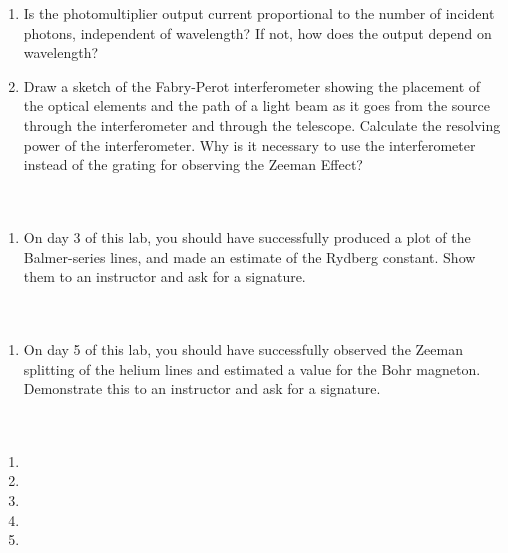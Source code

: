 \documentclass{signatures}
\begin{document}
\begin{enumerate}
    \item Is the photomultiplier output current proportional to the number of incident photons, independent of wavelength? If not, how does the output depend on wavelength?

    \item Draw a sketch of the Fabry-Perot interferometer showing the placement of the optical elements and the path of a light beam as it goes from the source through the interferometer and through the telescope. Calculate the resolving power of the interferometer. Why is it necessary to use the interferometer instead of the grating for observing the Zeeman Effect?
        \\ \\ \\
\end{enumerate}

\prelabsignatures

\midlab

\begin{enumerate}

    \item On day 3 of this lab, you should have successfully produced a plot of the Balmer-series lines, and made an estimate of the Rydberg constant. Show them to an instructor and ask for a signature.
\\ \\ \\
\end{enumerate}


\begin{enumerate}

\item On day 5 of this lab, you should have successfully observed the Zeeman splitting of the helium lines and estimated a value for the Bohr magneton. Demonstrate this to an instructor and ask for a signature.
\\ \\ \\
\end{enumerate}


\checkpointsection 

\begin{enumerate}

\item {}

\item {}

\item {}

\item {}

\item {}

\end{enumerate}
\end{document}
